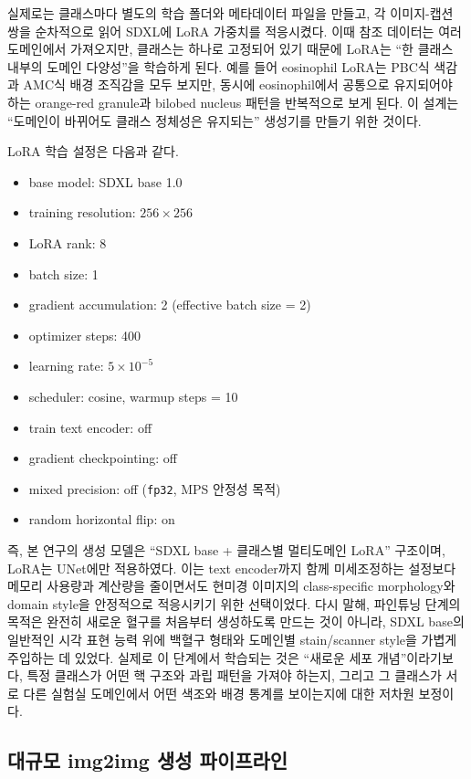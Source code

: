 \documentclass[11pt]{article}
\begin{document}
실제로는 클래스마다 별도의 학습 폴더와 메타데이터 파일을 만들고, 각 이미지-캡션 쌍을 순차적으로 읽어 SDXL에 LoRA 가중치를 적응시켰다. 이때 참조 데이터는 여러 도메인에서 가져오지만, 클래스는 하나로 고정되어 있기 때문에 LoRA는 ``한 클래스 내부의 도메인 다양성''을 학습하게 된다. 예를 들어 eosinophil LoRA는 PBC식 색감과 AMC식 배경 조직감을 모두 보지만, 동시에 eosinophil에서 공통으로 유지되어야 하는 orange-red granule과 bilobed nucleus 패턴을 반복적으로 보게 된다. 이 설계는 ``도메인이 바뀌어도 클래스 정체성은 유지되는'' 생성기를 만들기 위한 것이다.

LoRA 학습 설정은 다음과 같다.
\begin{itemize}
  \item base model: SDXL base 1.0
  \item training resolution: $256 \times 256$
  \item LoRA rank: 8
  \item batch size: 1
  \item gradient accumulation: 2 (effective batch size = 2)
  \item optimizer steps: 400
  \item learning rate: $5 \times 10^{-5}$
  \item scheduler: cosine, warmup steps = 10
  \item train text encoder: off
  \item gradient checkpointing: off
  \item mixed precision: off (\texttt{fp32}, MPS 안정성 목적)
  \item random horizontal flip: on
\end{itemize}

즉, 본 연구의 생성 모델은 ``SDXL base + 클래스별 멀티도메인 LoRA'' 구조이며, LoRA는 UNet에만 적용하였다. 이는 text encoder까지 함께 미세조정하는 설정보다 메모리 사용량과 계산량을 줄이면서도 현미경 이미지의 class-specific morphology와 domain style을 안정적으로 적응시키기 위한 선택이었다. 다시 말해, 파인튜닝 단계의 목적은 완전히 새로운 혈구를 처음부터 생성하도록 만드는 것이 아니라, SDXL base의 일반적인 시각 표현 능력 위에 백혈구 형태와 도메인별 stain/scanner style을 가볍게 주입하는 데 있었다. 실제로 이 단계에서 학습되는 것은 ``새로운 세포 개념''이라기보다, 특정 클래스가 어떤 핵 구조와 과립 패턴을 가져야 하는지, 그리고 그 클래스가 서로 다른 실험실 도메인에서 어떤 색조와 배경 통계를 보이는지에 대한 저차원 보정이다.

\subsection{대규모 img2img 생성 파이프라인}
\end{document}
